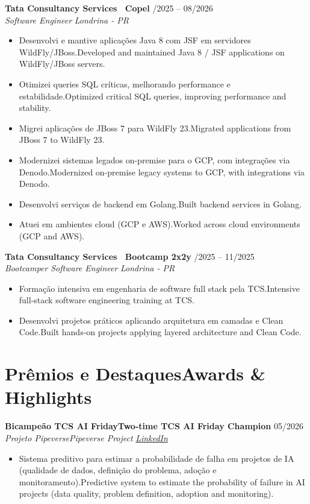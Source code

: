 \documentclass[a4paper,10pt]{article}
\newcommand{\tr}[2]{\ifdefined\CVPT #2\else #1\fi}
\newcommand{\entry}[4]{
  \noindent\textbf{#1} \hfill #2 \\
  \noindent\textit{#3} \hfill \textit{#4} \\
  \vspace{2pt}
}
\begin{document}
\entry{Tata Consultancy Services \textbar\ Copel}{\faCalendar \space 05/2025 -- 08/2026}{Software Engineer}{Londrina - PR}
\vspace{-0.4em}
\begin{itemize}[leftmargin=*, itemsep=2pt]
\setlength\itemsep{0em}
\item \tr{Developed and maintained Java 8 / JSF applications on WildFly/JBoss servers.}{Desenvolvi e mantive aplicações Java 8 com JSF em servidores WildFly/JBoss.}
\item \tr{Optimized critical SQL queries, improving performance and stability.}{Otimizei queries SQL críticas, melhorando performance e estabilidade.}
\item \tr{Migrated applications from JBoss 7 to WildFly 23.}{Migrei aplicações de JBoss 7 para WildFly 23.}
\item \tr{Modernized on-premise legacy systems to GCP, with integrations via Denodo.}{Modernizei sistemas legados on-premise para o GCP, com integrações via Denodo.}
\item \tr{Built backend services in Golang.}{Desenvolvi serviços de backend em Golang.}
\item \tr{Worked across cloud environments (GCP and AWS).}{Atuei em ambientes cloud (GCP e AWS).}
\end{itemize}

\entry{Tata Consultancy Services \textbar\ Bootcamp 2x2y}{\faCalendar \space 05/2025 -- 11/2025}{Bootcamper Software Engineer}{Londrina - PR}
\vspace{-0.4em}
\begin{itemize}[leftmargin=*, itemsep=2pt]
\setlength\itemsep{0em}
\item \tr{Intensive full-stack software engineering training at TCS.}{Formação intensiva em engenharia de software full stack pela TCS.}
\item \tr{Built hands-on projects applying layered architecture and Clean Code.}{Desenvolvi projetos práticos aplicando arquitetura em camadas e Clean Code.}
\end{itemize}

\section*{\tr{Awards \& Highlights}{Prêmios e Destaques}}

\entry{\tr{Two-time TCS AI Friday Champion}{Bicampeão TCS AI Friday}}{05/2026}{\tr{Pipeverse Project}{Projeto Pipeverse}}{\href{https://www.linkedin.com/posts/marcosh0wzy_tcs-tcsai-aifriday-activity-7463971325016006657-WzoZ}{\faLink \space LinkedIn}}
\vspace{-0.4em}
\begin{itemize}[leftmargin=*, itemsep=2pt]
\setlength\itemsep{0em}
\item \tr{Predictive system to estimate the probability of failure in AI projects (data quality, problem definition, adoption and monitoring).}{Sistema preditivo para estimar a probabilidade de falha em projetos de IA (qualidade de dados, definição do problema, adoção e monitoramento).}
\end{itemize}
\end{document}
